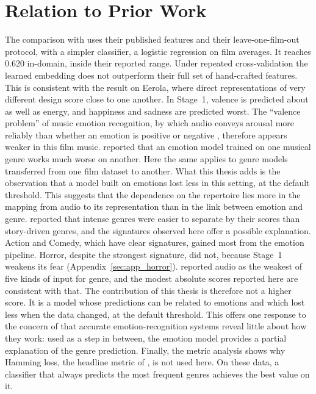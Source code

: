 \section{Relation to Prior Work}
\label{sec:disc_relatedwork}

The comparison with \citet{ma2021computational} uses their published features and their leave-one-film-out protocol, with a simpler classifier, a logistic regression on film averages. It reaches 0.620 in-domain, inside their reported range. Under repeated cross-validation the learned embedding does not outperform their full set of hand-crafted features. This is consistent with the result on Eerola, where direct representations of very different design score close
to one another. In Stage~1, valence is predicted about as well as energy, and happiness and sadness are predicted worst. The ``valence problem'' of music emotion recognition, by which audio conveys arousal more reliably than whether an emotion is positive or negative \citep{kim2010music,kang2025there}, therefore appears weaker in this film music. \citet{eerola2011genrespecific} reported that an emotion
model trained on one musical genre works much worse on another. Here the same applies to
genre models transferred from one film dataset to another. What this thesis adds is the observation that a model built on emotions lost less in this setting, at the default threshold. This suggests that the dependence on the repertoire lies more in the
mapping from audio to its representation than in the link between emotion and genre.
\citet{austin2010characterization} reported that intense genres were easier to separate by their
scores than story-driven genres, and the signatures observed here offer a possible
explanation. Action and Comedy, which have clear signatures, gained most from the emotion pipeline. Horror, despite the strongest signature, did not, because Stage~1 weakens its fear (Appendix~\ref{sec:app_horror}). \citet{mangolin2020multimodal} reported audio as the weakest of
five kinds of input for genre, and the modest absolute scores reported here are consistent
with that. The
contribution of this thesis is therefore not a higher score. It is a model whose
predictions can be related to emotions and which lost less when the data changed, at the default threshold. This offers
one response to the concern of \citet{kang2025there} that accurate emotion-recognition systems reveal little
about how they work: used as a step in between, the emotion model provides a partial
explanation of the genre prediction.
Finally, the metric analysis shows why Hamming loss, the headline metric of
\citet{behrouzi2023multimodal}, is not used here. On these data, a classifier that always
predicts the most frequent genres achieves the best value on it.
